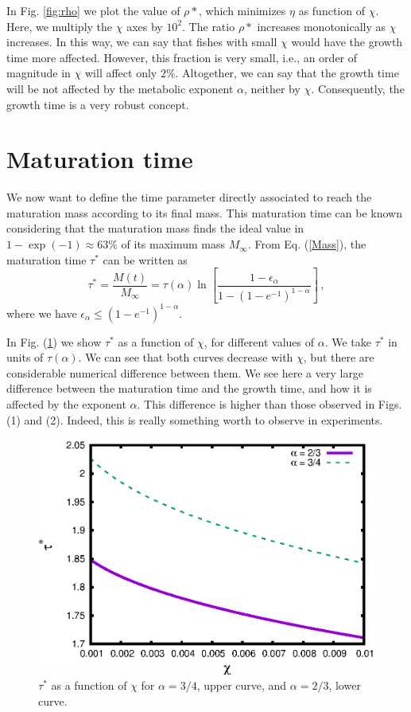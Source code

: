 \documentclass[10pt]{iopart}
\begin{document}
In Fig. \ref{fig:rho} we plot the value of $\rho*$, which minimizes $\eta$ as function of $\chi$.
Here, we multiply the $\chi$ axes by $10^{2}$.  The ratio $\rho*$ increases monotonically
as $\chi$ increases. In this way, we can say that fishes with small $\chi$ would have the growth
time more affected. However, this fraction is very small, i.e., an order of magnitude in $\chi$ will affect only $2\%$. Altogether, we can say that the growth time will be not affected by the metabolic exponent $\alpha$, neither by $\chi$. Consequently, the growth time is a very robust concept.

\section{Maturation time}

We now want to define the time parameter directly associated to reach the maturation mass according to its final mass. This maturation time can be known considering that the maturation mass finds the ideal value in $1-\exp{(-1)} \approx 63 \% $ of its maximum mass $M_{\infty}$. From Eq. (\ref{Mass}), the maturation time $\tau^*$ can be written as
\begin{equation}
\label{matu}
\tau^* =\frac{M(t)}{M_{\infty}}=\tau(\alpha) \ln{\left[\frac{1-\epsilon_{\alpha}}{1-(1-e^{-1})^{1-\alpha}}\right]}\,,
\end{equation}
where we have $\epsilon_{\alpha} \leq (1-e^{-1})^{1-\alpha}$.

In Fig. (\ref{fig:tau2}) we show $\tau^*$ as a function of $\chi$, for different values of $\alpha$. We take $\tau^*$ in units of $\tau(\alpha)$. We can see that both  curves decrease with $\chi$, but there are considerable numerical difference between them.
We see here a very large difference between the maturation time and the growth time, and how it is affected by the exponent $\alpha$.
This difference is higher than those observed in Figs. (1) and (2). Indeed, this is really something worth to observe in experiments.
\begin{figure}%
\centering
\includegraphics[width=.7\columnwidth]{figure_3}%
\caption{ $\tau^*$ as a function of $\chi$ for $\alpha = 3/4$, upper curve, and $\alpha = 2/3$, lower curve.}%
\label{fig:tau2}%
\end{figure}
\end{document}
